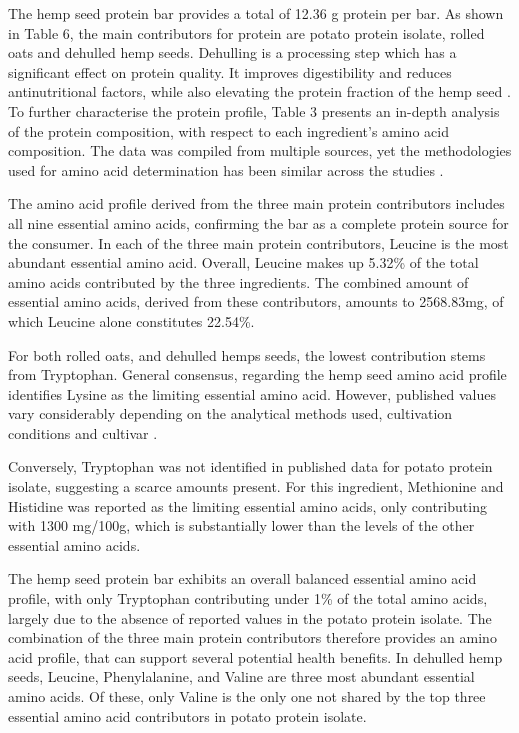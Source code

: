 \vspace{1em}
The hemp seed protein bar provides a total of 12.36 g protein per bar. As shown in Table 6, the main contributors for protein are potato protein isolate, rolled oats and dehulled hemp seeds. Dehulling is a processing step which has a significant effect on protein quality. It improves digestibility and reduces antinutritional factors, while also elevating the protein fraction of the hemp seed \cite*{HempBook}. To further characterise the protein profile, Table 3 presents an in-depth analysis of the protein composition, with respect to each ingredient’s amino acid composition. The data was compiled from multiple sources, yet the methodologies used for amino acid determination has been similar across the studies \cite*{art_08_protein_amino, frida_food, art_09_potato_protein, art_10_hemp_aa}.

\vspace{1em}
The amino acid profile derived from the three main protein contributors includes all nine essential amino acids, confirming the bar as a complete protein source for the consumer. In each of the three main protein contributors, Leucine is the most abundant essential amino acid. Overall, Leucine makes up 5.32\% of the total amino acids contributed by the three ingredients. The combined amount of essential amino acids, derived from these contributors, amounts to 2568.83mg, of which Leucine alone constitutes 22.54\%.

\vspace{1em}
For both rolled oats, and dehulled hemps seeds, the lowest contribution stems from Tryptophan. General consensus, regarding the hemp seed amino acid profile identifies Lysine as the limiting essential amino acid. However, published values vary considerably depending on the analytical methods used, cultivation conditions and cultivar \cite*{HempBook}. 

\vspace{1em}
Conversely, Tryptophan was not identified in published data for potato protein isolate, suggesting a scarce amounts present. For this ingredient, Methionine and Histidine was reported as the limiting essential amino acids, only contributing with 1300 mg/100g, which is substantially lower than the levels of the other essential amino acids. 

\vspace{1em}
The hemp seed protein bar exhibits an overall balanced essential amino acid profile, with only Tryptophan contributing under 1\% of the total amino acids, largely due to the absence of reported values in the potato protein isolate. The combination of the three main protein contributors therefore provides an amino acid profile, that can support several potential health benefits. In dehulled hemp seeds, Leucine, Phenylalanine, and Valine are three most abundant essential amino acids. Of these, only Valine is the only one not shared by the top three essential amino acid contributors in potato protein isolate. 

